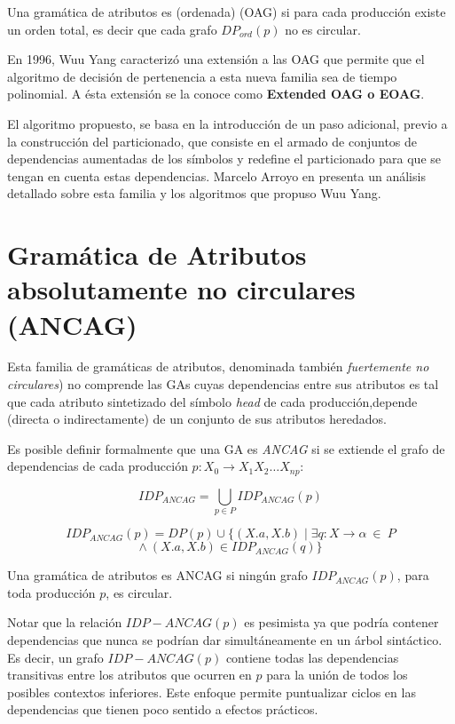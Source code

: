\begin{definition} Una gramática de atributos es (ordenada) (OAG) si para cada producción existe un orden total, es decir que cada grafo $ DP_{ord}(p) $ no es circular.
\end{definition}

En 1996, Wuu Yang\cite{wuu-yang4} caracterizó una extensión a las OAG que permite que el algoritmo de decisión de pertenencia a esta nueva familia sea de tiempo polinomial. A ésta extensión se la conoce como \textbf{Extended OAG o EOAG}.

El algoritmo propuesto, se basa en la introducción de un paso adicional, previo a la construcción del particionado, que consiste en el armado de conjuntos de dependencias aumentadas de los símbolos y redefine el particionado para que se tengan en cuenta estas dependencias.
Marcelo Arroyo en \cite{tesismarcelo} presenta un análisis detallado sobre esta familia y  los algoritmos que propuso Wuu Yang.

\section{Gramática de Atributos absolutamente no circulares (ANCAG)}

Esta familia de gramáticas de atributos, denominada también \emph{fuertemente no circulares}) no comprende las GAs cuyas dependencias entre sus atributos es tal que cada atributo sintetizado del símbolo \textit{head} de cada producción,depende (directa o indirectamente) de un conjunto de sus atributos heredados.

Es posible definir formalmente que una GA es \emph{ANCAG} si se extiende el grafo de dependencias de cada producción $p: X_0 \rightarrow X_1 X_2 \ldots X_{np}$:

$$ IDP_{ANCAG} = \bigcup_{p \in P} IDP_{ANCAG}(p) $$

$$ IDP_{ANCAG}(p) = DP(p) \cup \{ (X.a,X.b) \mid
                             \exists q: X \rightarrow \alpha \: \in \: P $$
                $$ \land \: (X.a,X.b) \in IDP_{ANCAG}(q) \} $$

\begin{definition} Una gramática de atributos es ANCAG si ningún grafo $ IDP_{ANCAG}(p) $, para toda producción $p$, es circular.
\end{definition}

Notar que la relación $IDP-ANCAG(p)$ es pesimista ya que podría contener dependencias que nunca se podrían dar simultáneamente en un árbol sintáctico. Es decir, un grafo $IDP-ANCAG(p)$ contiene todas las dependencias transitivas entre los atributos que ocurren en $p$ para la unión de todos los posibles contextos inferiores. Este enfoque permite puntualizar ciclos en las dependencias que tienen poco sentido a efectos prácticos.

